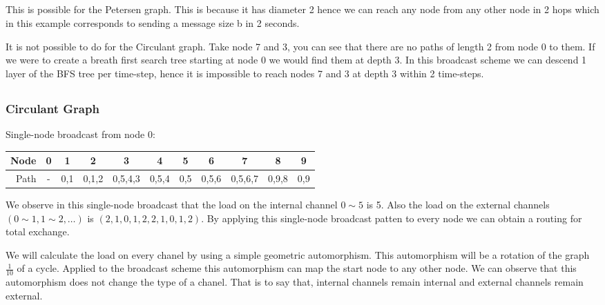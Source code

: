 \subsection{}
This is possible for the Petersen graph.
This is because it has diameter 2 hence we can reach any node from any other node in 2 hops which in this example corresponds to sending a message size b in 2 seconds.

It is not possible to do for the Circulant graph. Take node 7 and 3, you can see that there are no paths of length 2 from node 0 to them.
If we were to create a breath first search tree starting at node 0 we would find them at depth 3.
In this broadcast scheme we can descend 1 layer of the BFS tree per time-step, hence it is impossible to reach nodes 7 and 3 at depth 3 within 2 time-steps. 

\subsection{}
\subsubsection*{Circulant Graph}
Single-node broadcast from node 0:
\begin{center}
\begin{tabular}{r|cccccccccc}
 Node  &0& 1 & 2 & 3 & 4 & 5 & 6 & 7 & 8 & 9\\
 \hline
 Path  & - & 0,1 & 0,1,2 & 0,5,4,3 & 0,5,4 & 0,5 & 0,5,6 & 0,5,6,7 & 0,9,8 & 0,9 \\
\end{tabular}
\end{center}

We observe in this single-node broadcast that the load on the internal channel $0\sim 5$ is 5.
Also the load on the external channels $(0\sim 1, 1\sim 2, \ldots)$ is $(2,1,0,1,2,2,1,0,1,2)$.
By applying this single-node broadcast patten to every node we can obtain a routing for total exchange.

We will calculate the load on every chanel by using a simple geometric automorphism.
This automorphism will be a rotation of the graph $\frac{1}{10}$ of a cycle.
Applied to the broadcast scheme this automorphism can map the start node to any other node.
We can observe that this automorphism does not change the type of a chanel.
That is to say that, internal channels remain internal and external channels remain external.

